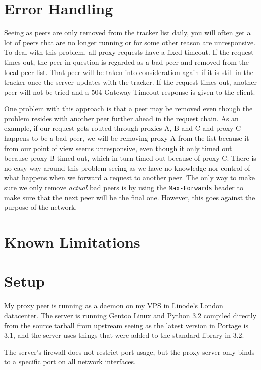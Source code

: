 \documentclass{sig-alternate}
\begin{document}
\section{Error Handling}
\label{sec:errorhandling}

Seeing as peers are only removed from the tracker list daily, you will often
get a lot of peers that are no longer running or for some other reason are
unresponsive. To deal with this problem, all proxy requests have a fixed
timeout. If the request times out, the peer in question is regarded as a
bad peer and removed from the local peer list. That peer will be taken into
consideration again if it is still in the tracker once the server updates with
the tracker. If the request times out, another peer will not be tried and a
504 Gateway Timeout response is given to the client.

One problem with this approach is that a peer may be removed even though
the problem resides with another peer further ahead in the request chain.
As an example, if our request gets routed through proxies A, B and C and
proxy C happens to be a bad peer, we will be removing proxy A from the list
because it from our point of view seems unresponsive, even though it only
timed out because proxy B timed out, which in turn timed out because of proxy
C. There is no easy way around this problem seeing as we have no knowledge
nor control of what happens when we forward a request to another peer. The
only way to make sure we only remove \emph{actual} bad peers is by using the
\verb+Max-Forwards+ header to make sure that the next peer will be the final
one. However, this goes against the purpose of the network.


\section{Known Limitations}
\label{sec:limitations}


\section{Setup}
\label{sec:setup}

My proxy peer is running as a daemon on my VPS in Linode's London datacenter.
The server is running Gentoo Linux and Python 3.2 compiled directly from the
source tarball from upstream seeing as the latest version in Portage is 3.1,
and the server uses things that were added to the standard library in 3.2.

The server's firewall does not restrict port usage, but the proxy server only
binds to a specific port on all network interfaces.
\end{document}
